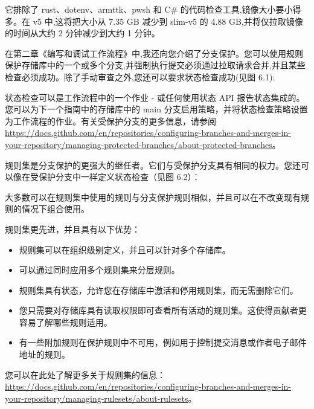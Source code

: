 它排除了 rust、dotenv、armttk、pwsh 和 C\# 的代码检查工具,镜像大小要小得多。在 v5 中,这将把大小从 7.35 GB 减少到 slim-v5 的 4.88 GB,并将仅拉取镜像的时间从大约 2 分钟减少到大约 1 分钟。


在第二章《编写和调试工作流程》中,我还向您介绍了分支保护。您可以使用规则保护存储库中的一个或多个分支,并强制执行提交必须通过拉取请求合并,并且某些检查必须成功。除了手动审查之外,您还可以要求状态检查成功(见图 6.1):


状态检查可以是工作流程中的一个作业 - 或任何使用状态 API 报告状态集成的。您可以为下一个指南中的存储库中的 main 分支启用策略，并将状态检查策略设置为工作流程的作业。有关受保护分支的更多信息，请参阅 \url{https://docs.github.com/en/repositories/configuring-branches-and-merges-in-your-repository/managing-protected-branches/about-protected-branches}。


规则集是分支保护的更强大的继任者。它们与受保护分支具有相同的权力。您还可以像在受保护分支中一样定义状态检查（见图 6.2）：


大多数可以在规则集中使用的规则与分支保护规则相似，并且可以在不改变现有规则的情况下组合使用。

规则集更先进，并且具有以下优势：

\begin{itemize}
\item 
规则集可以在组织级别定义，并且可以针对多个存储库。

\item
可以通过同时应用多个规则集来分层规则。

\item
规则集具有状态，允许您在存储库中激活和停用规则集，而无需删除它们。

\item
您只需要对存储库具有读取权限即可查看所有活动的规则集。这使得贡献者更容易了解哪些规则适用。

\item
有一些附加规则在保护规则中不可用，例如用于控制提交消息或作者电子邮件地址的规则。
\end{itemize}

您可以在此处了解更多关于规则集的信息：\url{https://docs.github.com/en/repositories/configuring-branches-and-merges-in-your-repository/managing-rulesets/about-rulesets}。